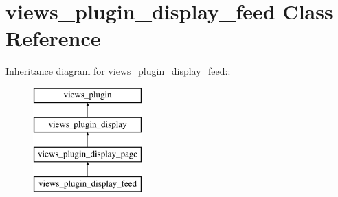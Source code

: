\hypertarget{classviews__plugin__display__feed}{
\section{views\_\-plugin\_\-display\_\-feed Class Reference}
\label{classviews__plugin__display__feed}
}
Inheritance diagram for views\_\-plugin\_\-display\_\-feed::\begin{figure}[H]
\begin{center}
\leavevmode
\includegraphics[height=4cm]{classviews__plugin__display__feed}
\end{center}
\end{figure}
